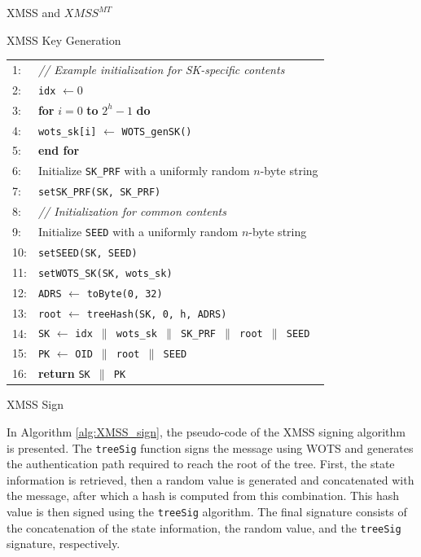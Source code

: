 \begin{section}{XMSS and $XMSS^{MT}$}
\begin{subsection}{XMSS Key Generation}
\begin{algorithm}
\begin{tabular}{ll}
1: & \textit{// Example initialization for SK-specific contents} \\
2: & \texttt{idx} $\leftarrow 0$ \\
3: & \textbf{for} $i = 0$ \textbf{to} $2^h - 1$ \textbf{do} \\
4: & \quad \texttt{wots\_sk[i]} $\leftarrow$ \texttt{WOTS\_genSK()} \\
5: & \textbf{end for} \\
6: & Initialize \texttt{SK\_PRF} with a uniformly random $n$-byte string \\
7: & \texttt{setSK\_PRF(SK, SK\_PRF)} \\
8: & \textit{// Initialization for common contents} \\
9: & Initialize \texttt{SEED} with a uniformly random $n$-byte string \\
10: & \texttt{setSEED(SK, SEED)} \\
11: & \texttt{setWOTS\_SK(SK, wots\_sk)} \\
12: & \texttt{ADRS} $\leftarrow$ \texttt{toByte(0, 32)} \\
13: & \texttt{root} $\leftarrow$ \texttt{treeHash(SK, 0, h, ADRS)} \\
14: & \texttt{SK} $\leftarrow$ \texttt{idx $\parallel$ wots\_sk $\parallel$ SK\_PRF $\parallel$ root $\parallel$ SEED} \\
15: & \texttt{PK} $\leftarrow$ \texttt{OID $\parallel$ root $\parallel$ SEED} \\
16: & \textbf{return} \texttt{SK $\parallel$ PK}
\end{tabular}

\end{algorithm}

        
    \end{subsection}

    \begin{subsection}{XMSS Sign}

        In Algorithm \ref{alg:XMSS_sign}, the pseudo-code of the XMSS signing algorithm is presented. The \texttt{treeSig} function signs the message using WOTS and generates the authentication path required to reach the root of the tree. First, the state information is retrieved, then a random value is generated and concatenated with the message, after which a hash is computed from this combination. This hash value is then signed using the \texttt{treeSig} algorithm. The final signature consists of the concatenation of the state information, the random value, and the \texttt{treeSig} signature, respectively.



\end{subsection}
\end{section}

